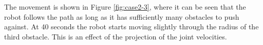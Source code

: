 The movement is shown in Figure \ref{fig:case2-3}, where it can be seen that the robot follows the path as long as it has sufficiently many obstacles to push against. At 40 seconds the robot starts moving slightly through the radius of the third obstacle. This is an effect of the projection of the joint velocities.

\begin{figure}
    \centering
    
    \hfil
    

\end{figure}
